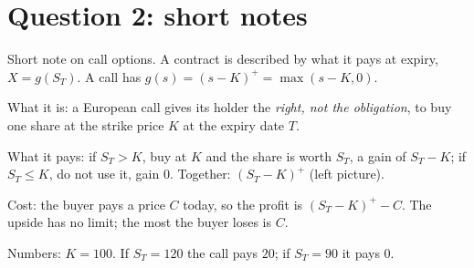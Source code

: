 \section{Question 2: short notes}

\begin{pic}
\end{pic}

\begin{problem}[Q2(a)]
Short note on call options.
\cardsays A contract is described by what it pays at expiry, $X=g(S_T)$. A call has $g(s)=(s-K)^+=\max(s-K,0)$.
\working
\begin{steps}
\item What it is: a European call gives its holder the \emph{right, not the obligation}, to buy one share at the strike price $K$ at the expiry date $T$.
\item What it pays: if $S_T>K$, buy at $K$ and the share is worth $S_T$, a gain of $S_T-K$; if $S_T\le K$, do not use it, gain $0$. Together: $(S_T-K)^+$ (left picture).
\item Cost: the buyer pays a price $C$ today, so the profit is $(S_T-K)^+-C$. The upside has no limit; the most the buyer loses is $C$.
\item Numbers: $K=100$. If $S_T=120$ the call pays $20$; if $S_T=90$ it pays $0$.
\end{steps}
\end{problem}

